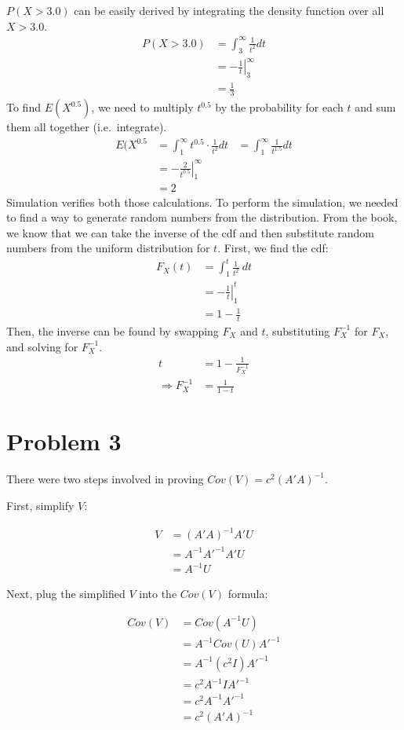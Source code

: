 \documentclass{article}
\begin{document}
$P( X > 3.0 )$ can be easily derived by integrating the density function over
all $X > 3.0$.
\begin{align*}
  P( X > 3.0 ) &= \int_{3}^{\infty} \frac{1}{t^2} dt \\
               &= \left.-\frac{1}{t} \right|_3^\infty \\
               &= \frac{1}{3}
\end{align*}
To find $E(X^{0.5})$, we need to multiply $t^{0.5}$ by the probability for each
$t$ and sum them all together (i.e.\ integrate).
\begin{align*}
  E( X^{0.5} &= \int_1^\infty t^{0.5}\cdot\frac{1}{t^2} dt
  &= \int_1^\infty \frac{1}{t^{1.5}}
  dt \\
  &=\left. - \frac{2}{t^{0.5}} \right|_1^\infty \\
  &= 2
\end{align*}
Simulation verifies both those calculations. To perform the simulation, we needed to
find a way to generate random numbers from the distribution. From the book, we
know that we can take the inverse of the cdf and then substitute random
numbers from the uniform distribution for $t$. First, we find the cdf:
\begin{align*}
  F_X(t) &= \int_1^t \frac{1}{t^2} \ dt \\
         &= \left. - \frac{1}{t} \right|_1^t \\
         &= 1 - \frac{1}{t}
\end{align*}
Then, the inverse can be found by swapping $F_X$ and $t$, substituting
$F_X^{-1}$ for $F_X$, and solving for $F_X^{-1}$.
\begin{align*}
  t &= 1 - \frac{1}{F_X^{-1}} \\
  \Rightarrow F_X^{-1} &= \frac{1}{1 - t}
\end{align*}

\section*{Problem 3}

There were two steps involved in proving $Cov(V) = c^{2}(A'A)^{-1}$.

First, simplify $V$:

\begin{align*}
  V &= (A'A)^{-1}A'U \\
    &= A^{-1}A'^{-1}A'U \\
    &= A^{-1}U
\end{align*}

Next, plug the simplified $V$ into the $Cov(V)$ formula:

\begin{align*}
  Cov(V) &= Cov(A^{-1}U) \\
         &= A^{-1}Cov(U)A'^{-1} \\
         &= A^{-1}(c^{2}I)A'^{-1} \\
         &= c^{2}A^{-1}IA'^{-1} \\
         &= c^{2}A^{-1}A'^{-1} \\
         &= c^{2}(A'A)^{-1}
\end{align*}
\end{document}
